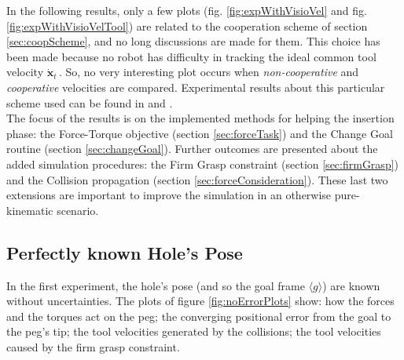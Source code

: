 In the following results, only a few plots (fig. \ref{fig:expWithVisioVel} and fig. \ref{fig:expWithVisioVelTool}) are related to the cooperation scheme of section \ref{sec:coopScheme}, and no long discussions are made for them. This choice has been made because no robot has difficulty in tracking the ideal common tool velocity $\dot{\boldsymbol{x}}_t\,$. So, no very interesting plot occurs when \textit{non-cooperative} and \textit{cooperative} velocities are compared. Experimental results about this particular scheme used can be found in \cite{IntroMaris2} and \cite{tesiWander}.\\

The focus of the results is on the implemented methods for helping the insertion phase: the Force-Torque objective (section \ref{sec:forceTask}) and the Change Goal routine (section \ref{sec:changeGoal}). Further outcomes are presented about the added simulation procedures: the Firm Grasp constraint (section \ref{sec:firmGrasp}) and the Collision propagation (section \ref{sec:forceConsideration}). These last two extensions are important to improve the simulation in an otherwise pure-kinematic scenario.

\subsection{Perfectly known Hole's Pose}
\label{sec:testPerfectHolePose}
In the first experiment, the hole's pose (and so the goal frame $\langle g \rangle$) are known without uncertainties. The plots of figure \ref{fig:noErrorPlots} show: how the forces and the torques act on the peg; the converging positional error from the goal to the peg's tip; the tool velocities generated by the collisions; the tool velocities caused by the firm grasp constraint.

